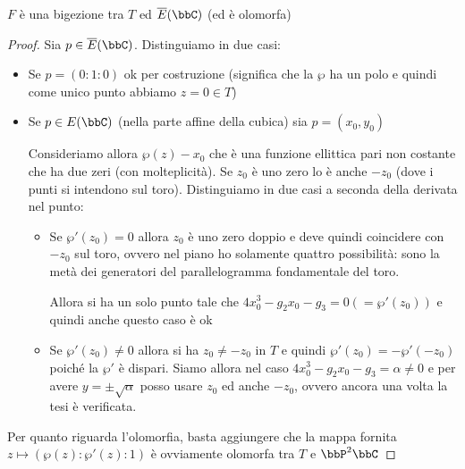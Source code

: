 \begin{proposizione}
  $F$ è una bigezione tra $T$ ed $\ol{E}(\bbC)$ (ed è olomorfa)
\end{proposizione}
\begin{proof}
  Sia $p \in \ol{E}(\bbC)$. Distinguiamo in due casi:
  \begin{itemize}
  \item Se $p = (0 : 1 : 0)$ ok per costruzione (significa che la $\wp$
    ha un polo e quindi come unico punto abbiamo $z = 0 \in T$)
  \item Se $p \in E(\bbC)$ (nella parte affine della cubica) sia $p =
    (x_0, y_0)$

    Consideriamo allora $\wp(z) - x_0$ che è una funzione ellittica pari
    non costante che ha due zeri (con molteplicità). Se $z_0$ è uno zero
    lo è anche $- z_0$ (dove i punti si intendono sul
    toro). Distinguiamo in due casi a seconda della derivata nel punto:
    \begin{itemize}
    \item Se $\wp'(z_0) = 0$ allora $z_0$ è uno zero doppio e deve
      quindi coincidere con $-z_0$ sul toro, ovvero nel piano ho
      solamente quattro possibilità: sono la metà dei generatori del
      parallelogramma fondamentale del toro.
      

      Allora si ha un solo punto tale che $4x_0^3 - g_2 x_0 - g_3 = 0 (=
      \wp'(z_0))$ e quindi anche questo caso è ok
    \item Se $\wp'(z_0) \neq 0$ allora si ha $z_0 \neq - z_0$ in $T$ e
      quindi $\wp'(z_0) = - \wp'(-z_0)$ poiché la $\wp'$ è
      dispari. Siamo allora nel caso $4x_0^3 - g_2 x_0 - g_3 = \alpha
      \neq 0$ e per avere $y = \pm \sqrt{\alpha}$ posso usare $z_0$ ed
      anche $-z_0$, ovvero ancora una volta la tesi è verificata.
    \end{itemize}
  \end{itemize}

  Per quanto riguarda l'olomorfia, basta aggiungere che la mappa fornita
  $z \mapsto (\wp(z) : \wp'(z) : 1)$ è ovviamente olomorfa tra $T$ e
  $\bbP^2 \bbC$
\end{proof}

